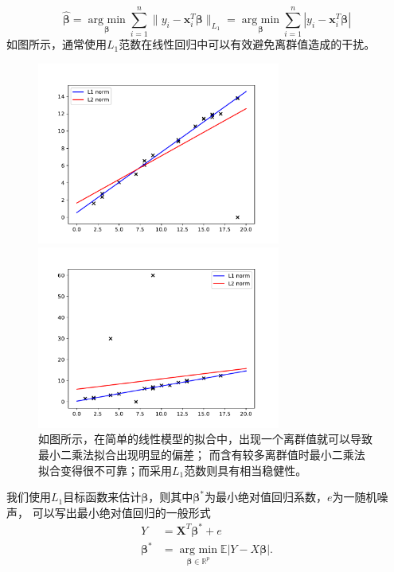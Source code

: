 \begin{equation}\label{l1loss}
\hat{\bm{\beta}} = \underset{\bm{\beta}}{\operatorname{arg\ min}} \sum_{i=1}^n\|y_i - \bm{x}^T_i\bm{\beta}\|_{L_1}
=\underset{\bm{\beta}}{\operatorname{arg\ min}} \sum_{i=1}^n|y_i - \bm{x}^T_i\bm{\beta}|
\end{equation}
如图所示，通常使用$L_1$范数在线性回归中可以有效避免离群值造成的干扰。
\begin{figure}[H]
    \centering
    \begin{minipage}[t]{0.48\textwidth}
    \includegraphics[width=8cm]{pics/chapter2/l1-l2-diff2.pdf}
    \end{minipage}
    \begin{minipage}[t]{0.48\textwidth}
    \includegraphics[width=8cm]{pics/chapter2/l1-l2-diff.pdf}
    \end{minipage}
    \caption{\small 如图所示，在简单的线性模型的拟合中，出现一个离群值就可以导致最小二乘法拟合出现明显的偏差；
    而含有较多离群值时最小二乘法拟合变得很不可靠；而采用$L_1$范数则具有相当稳健性。}
    \label{fig2.1}

\end{figure}

我们使用$L_1$目标函数来估计$\bm{\beta}$，则其中$\bm{\beta}^*$为最小绝对值回归系数，$e$为一随机噪声，
可以写出最小绝对值回归的一般形式
\begin{equation} \label{l1losstotal}
    \begin{split}
    Y &= \bm{X}^T\bm{\beta}^* + e\\
    \bm{\beta}^* &= \underset{\bm{\beta}\in \mathbb{R}^{p}}{\operatorname {arg\ min}}
    \mathbb{E}|Y - X\bm{\beta}|.
    \end{split}
\end{equation}

